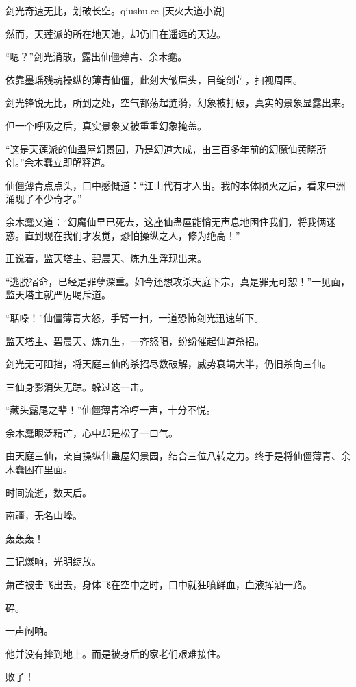 
\begin{this_body}

剑光奇速无比，划破长空。qiushu.cc [天火大道小说]

然而，天莲派的所在地天池，却仍旧在遥远的天边。

“嗯？”剑光消散，露出仙僵薄青、余木蠢。

依靠墨瑶残魂操纵的薄青仙僵，此刻大皱眉头，目绽剑芒，扫视周围。

剑光锋锐无比，所到之处，空气都荡起涟漪，幻象被打破，真实的景象显露出来。

但一个呼吸之后，真实景象又被重重幻象掩盖。

“这是天莲派的仙蛊屋幻景园，乃是幻道大成，由三百多年前的幻魔仙黄晓所创。”余木蠢立即解释道。

仙僵薄青点点头，口中感慨道：“江山代有才人出。我的本体陨灭之后，看来中洲涌现了不少奇才。”

余木蠢又道：“幻魔仙早已死去，这座仙蛊屋能悄无声息地困住我们，将我俩迷惑。直到现在我们才发觉，恐怕操纵之人，修为绝高！”

正说着，监天塔主、碧晨天、炼九生浮现出来。

“逃脱宿命，已经是罪孽深重。如今还想攻杀天庭下宗，真是罪无可恕！”一见面，监天塔主就严厉喝斥道。

“聒噪！”仙僵薄青大怒，手臂一扫，一道恐怖剑光迅速斩下。

监天塔主、碧晨天、炼九生，一齐怒喝，纷纷催起仙道杀招。

剑光无可阻挡，将天庭三仙的杀招尽数破解，威势衰竭大半，仍旧杀向三仙。

三仙身影消失无踪。躲过这一击。

“藏头露尾之辈！”仙僵薄青冷哼一声，十分不悦。

余木蠢眼泛精芒，心中却是松了一口气。

由天庭三仙，亲自操纵仙蛊屋幻景园，结合三位八转之力。终于是将仙僵薄青、余木蠢困在里面。

时间流逝，数天后。

南疆，无名山峰。

轰轰轰！

三记爆响，光明绽放。

萧芒被击飞出去，身体飞在空中之时，口中就狂喷鲜血，血液挥洒一路。

砰。

一声闷响。

他并没有摔到地上。而是被身后的家老们艰难接住。

败了！


\end{this_body}
